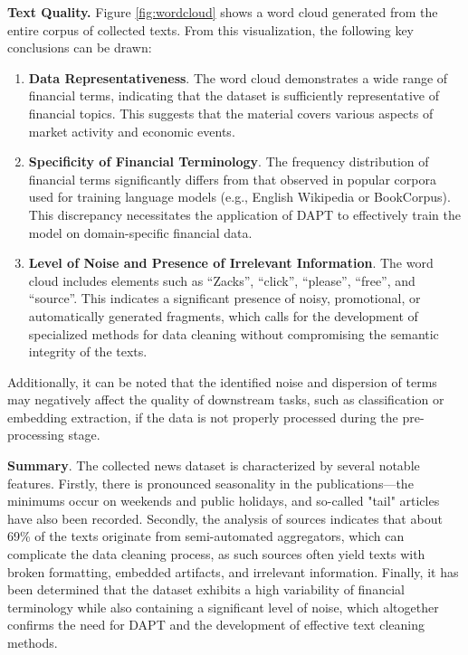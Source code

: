 \textbf{Text Quality.} Figure \ref{fig:wordcloud} shows a word cloud generated from the entire corpus of collected texts.
From this visualization, the following key conclusions can be drawn:

\begin{enumerate}
    \item \textbf{Data Representativeness}. The word cloud demonstrates a wide range of financial terms, indicating that the dataset
    is sufficiently representative of financial topics. This suggests that the material covers various aspects of market activity
    and economic events.
    \item \textbf{Specificity of Financial Terminology}. The frequency distribution of financial terms significantly differs from that observed
    in popular corpora used for training language models (e.g., English Wikipedia or BookCorpus). This discrepancy necessitates the application
    of DAPT to effectively train the model on domain-specific financial data.
    \item \textbf{Level of Noise and Presence of Irrelevant Information}. The word cloud includes elements such as “Zacks”, “click”, “please”,
    “free”, and “source”. This indicates a significant presence of noisy, promotional, or automatically generated fragments, which calls
    for the development of specialized methods for data cleaning without compromising the semantic integrity of the texts.
\end{enumerate}

Additionally, it can be noted that the identified noise and dispersion of terms may negatively affect the quality of downstream tasks,
such as classification or embedding extraction, if the data is not properly processed during the pre-processing stage.

\textbf{Summary}. The collected news dataset is characterized by several notable features. Firstly, there is pronounced seasonality
in the publications—the minimums occur on weekends and public holidays, and so-called "tail" articles have also been recorded.
Secondly, the analysis of sources indicates that about 69\% of the texts originate from semi-automated aggregators, which can complicate
the data cleaning process, as such sources often yield texts with broken formatting, embedded artifacts, and irrelevant information.
Finally, it has been determined that the dataset exhibits a high variability of financial terminology while also containing a significant
level of noise, which altogether confirms the need for DAPT and the development of effective text cleaning
methods.

